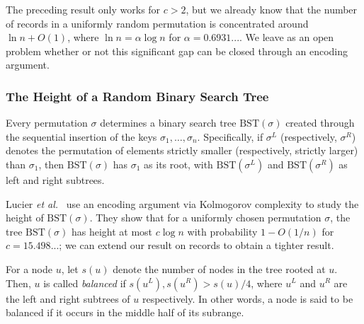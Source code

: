 \documentclass{patmorin}
\begin{document}
\begin{rem}
  The preceding result only works for $c > 2$, but we already know
  that the number of records in a uniformly random permutation is
  concentrated around $\ln n + O(1)$, where $\ln n = \alpha \log n$
  for $\alpha = 0.6931...$. We leave as an open problem whether or not
  this significant gap can be closed through an encoding argument.
\end{rem}

\subsubsection{The Height of a Random Binary Search Tree}

Every permutation $\sigma$ determines a binary search tree
$\text{BST}(\sigma)$ created through the sequential insertion of the
keys $\sigma_1, \ldots, \sigma_n$. Specifically, if $\sigma^L$
(respectively, $\sigma^R$) denotes the permutation of elements
strictly smaller (respectively, strictly larger) than $\sigma_1$, then
$\text{BST}(\sigma)$ has $\sigma_1$ as its root, with
$\text{BST}(\sigma^L)$ and $\text{BST}(\sigma^R)$ as left and right
subtrees.

Lucier \emph{et al.}~\cite{lucier.jiang.li:quicksort} use an encoding
argument via Kolmogorov complexity to study the height of
$\text{BST}(\sigma)$. They show that for a uniformly chosen
permutation $\sigma$, the tree $\text{BST}(\sigma)$ has height at most
$c \log n$ with probability $1 - O(1/n)$ for $c = 15.498...$; we can
extend our result on records to obtain a tighter result.

For a node $u$, let $s(u)$ denote the number of nodes in the tree
rooted at $u$. Then, $u$ is called \emph{balanced} if $s(u^L), s(u^R)
> s(u)/4$, where $u^L$ and $u^R$ are the left and right subtrees of
$u$ respectively. In other words, a node is said to be balanced if it
occurs in the middle half of its subrange.
\end{document}
